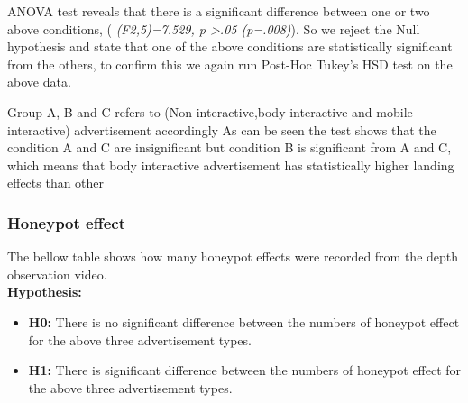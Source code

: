 ANOVA test reveals that there is a significant difference between one or two above conditions, ( \emph{(F2,5)=7.529, p >.05 (p=.008)}). So we reject the Null hypothesis and state that one of the above conditions are statistically significant from the others, to confirm this we again run Post-Hoc Tukey’s HSD test on the above data.


\begin{table}[H]
\caption{Post-Hoc Tukey’s HSD results}
\label{tab:landing-non-posthoctukey}
\centering
{}
\end{table}


Group A, B and C refers to (Non-interactive,body interactive and mobile interactive) advertisement accordingly As can be seen the test shows that the condition A and C are insignificant but condition B is significant from A and C, which means that body interactive advertisement has statistically higher landing effects than other 


\subsubsection {Honeypot effect}
The bellow table shows how many honeypot effects were recorded from the depth observation video.\\

\textbf{Hypothesis: }
\begin{itemize}
\item \textbf{H0:} There is no significant difference between the numbers of honeypot effect for the above three advertisement types.
\item \textbf{H1:} There is significant difference between the numbers of honeypot effect for the above three advertisement types.
\end{itemize}


